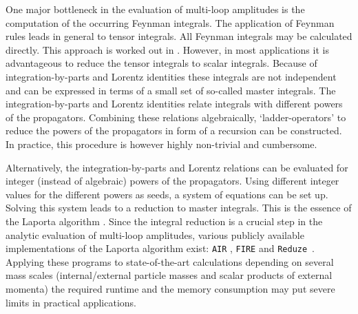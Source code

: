 \documentclass[a4paper,12pt]{scrartcl}
\newcommand*{\air}{\texttt{AIR}}
\newcommand*{\fire}{\texttt{FIRE}}
\newcommand*{\reduze}{\texttt{Reduze}}
\begin{document}
One major bottleneck in the evaluation of multi-loop amplitudes is the
computation of the occurring Feynman integrals. The application of
Feynman rules leads in general to tensor integrals. All Feynman
integrals may be calculated directly. This approach is worked out in
\cite{Dubovyk:2016aqv,Dubovyk:2016ocz,Dubovyk:2016zok}. However, in
most applications it is advantageous to reduce the tensor integrals to
scalar integrals.  Because of integration-by-parts
\cite{Tkachov:1981wb,Chetyrkin:1981qh} and Lorentz
\cite{Gehrmann:1999as} identities these integrals are not independent
and can be expressed in terms of a small set of so-called master
integrals.  The integration-by-parts and Lorentz identities relate
integrals with different powers of the propagators. Combining these
relations algebraically, `ladder-operators' to reduce the powers of
the propagators in form of a recursion can be constructed.  In
practice, this procedure is however highly non-trivial and cumbersome.

Alternatively, the integration-by-parts and Lorentz relations can be evaluated
for integer (instead of algebraic) powers of the propagators. Using different
integer values for the different powers as seeds, a system of equations can be
set up. Solving this system leads to a reduction to master
integrals. This is the essence of the Laporta algorithm \cite{Laporta:2001dd}.
Since the integral reduction is a crucial step in the analytic evaluation of
multi-loop amplitudes, various publicly available implementations of the Laporta
algorithm exist: \air{} \cite{Anastasiou:2004vj}, \fire{} \cite{Smirnov:2008iw,Smirnov:2013dia,Smirnov:2014hma}
and \reduze{}~\cite{Studerus:2009ye,vonManteuffel:2012np}. Applying these
programs to state-of-the-art calculations depending on several mass scales
(internal/external particle masses and scalar products of external momenta) the
required runtime and the memory consumption may put severe limits in practical
applications.
\end{document}
